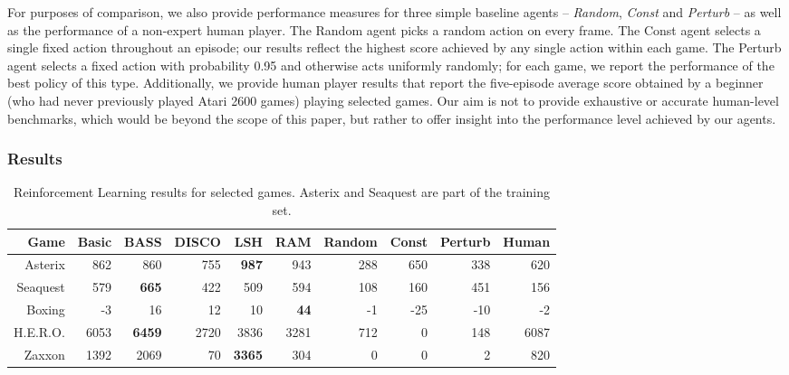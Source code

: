 \documentclass[twoside,11pt]{article}
\newcommand{\gamename}[1]{{\sc #1}}
\begin{document}
For purposes of comparison, we also provide performance measures for three simple baseline agents -- \emph{Random}, \emph{Const} and \emph{Perturb} -- as well as the performance of a non-expert human player. The Random agent picks a random action on every frame. The Const agent selects a single fixed action throughout an episode; our results reflect the highest score achieved by any single action within each game. The Perturb agent selects a fixed action with probability 0.95 and otherwise acts uniformly randomly; for each game, we report the performance of the best policy of this type. 
Additionally, we provide human player results that report the five-episode average score obtained by a beginner (who had never previously played Atari 2600 games) playing selected games. Our aim is not to provide exhaustive or accurate human-level benchmarks, which would be beyond the scope of this paper, but rather to offer insight into the performance level achieved by our agents. 

\subsubsection{Results}
\label{sec:RL:results}

\begin{table}
\small
\begin{center}
\clearpage{}\begin{tabular}{|r|r|r|r|r|r||r|r|r|r|}
\hline
Game & Basic & BASS & DISCO & LSH & RAM & Random & Const & Perturb & Human \\
\hline
\hline
\gamename{Asterix} & 862& 860& 755& \textbf { 987 }& 943& 288& 650& 338& 620\\
\hline
\gamename{Seaquest} & 579& \textbf { 665 }& 422& 509& 594& 108& 160& 451& 156\\
\hline
\gamename{Boxing} & -3& 16& 12& 10& \textbf { 44 }& -1& -25& -10& -2\\
\hline
\gamename{H.E.R.O.} & 6053& \textbf { 6459 }& 2720& 3836& 3281& 712& 0& 148& 6087\\
\hline
\gamename{Zaxxon} & 1392& 2069& 70& \textbf { 3365 }& 304& 0& 0& 2& 820\\
\hline
\end{tabular}
\clearpage{}
\end{center}
\vspace{-1.6em}
\caption{Reinforcement Learning results for selected games. \gamename{Asterix} and \gamename{Seaquest} are part of the training set.\label{table:selected_rl_results}}
\end{table}
\end{document}
